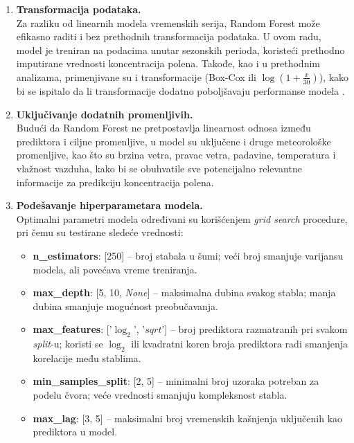 \documentclass[12pt]{article}
\begin{document}
\begin{enumerate}
    \item \textbf{Transformacija podataka.} \\
    Za razliku od linearnih modela vremenskih serija, Random Forest može efikasno raditi i bez prethodnih transformacija podataka. U ovom radu, model je treniran na podacima unutar sezonskih perioda, koristeći prethodno imputirane vrednosti koncentracija polena. Takođe, kao i u prethodnim analizama, primenjivane su i transformacije (Box-Cox ili $\log(1 + \frac{x}{30})$), kako bi se ispitalo da li transformacije dodatno poboljšavaju performanse modela \cite{boxcox1964}.

    \item \textbf{Uključivanje dodatnih promenljivih.} \\
    Budući da Random Forest ne pretpostavlja linearnost odnosa između prediktora i ciljne promenljive, u model su uključene i druge meteorološke promenljive, kao što su brzina vetra, pravac vetra, padavine, temperatura i vlažnost vazduha, kako bi se obuhvatile sve potencijalno relevantne informacije za predikciju koncentracija polena.

    \item \textbf{Podešavanje hiperparametara modela.} \\
    Optimalni parametri modela određivani su korišćenjem \textit{grid search} procedure, pri čemu su testirane sledeće vrednosti:
    \begin{itemize}
        \item \textbf{n\_estimators}: [250] – broj stabala u šumi; veći broj smanjuje varijansu modela, ali povećava vreme treniranja.
        \item \textbf{max\_depth}: [5, 10, \textit{None}] – maksimalna dubina svakog stabla; manja dubina smanjuje mogućnost preobučavanja.
        \item \textbf{max\_features}: ['$\log_2$', '$sqrt$'] – broj prediktora razmatranih pri svakom \textit{split}-u; koristi se $\log_2$ ili kvadratni koren broja prediktora radi smanjenja korelacije među stablima.
        \item \textbf{min\_samples\_split}: [2, 5] – minimalni broj uzoraka potreban za podelu čvora; veće vrednosti smanjuju kompleksnost stabla.
        \item \textbf{max\_lag}: [3, 5] – maksimalni broj vremenskih kašnjenja uključenih kao prediktora u model.
    \end{itemize}


\end{enumerate}
\end{document}
